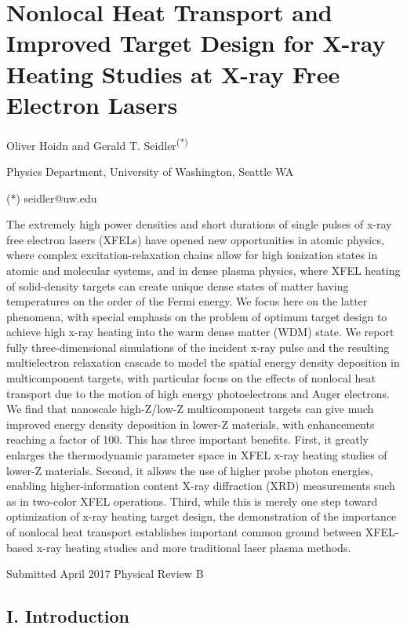 
\chapter{Nonlocal Heat Transport and Improved Target Design for X-ray Heating Studies at X-ray Free Electron Lasers}
\label{chap:hef_chapter}

Oliver Hoidn and Gerald T. Seidler\textsuperscript{(*)}

Physics Department, University of Washington, Seattle WA

(*) seidler@uw.edu

The extremely high power densities and short durations of single pulses
of x-ray free electron lasers (XFELs) have opened new opportunities in
atomic physics, where complex excitation-relaxation chains allow for
high ionization states in atomic and molecular systems, and in dense
plasma physics, where XFEL heating of solid-density targets can create
unique dense states of matter having temperatures on the order of the
Fermi energy. We focus here on the latter phenomena, with special
emphasis on the problem of optimum target design to achieve high x-ray
heating into the warm dense matter (WDM) state. We report fully
three-dimensional simulations of the incident x-ray pulse and the
resulting multielectron relaxation cascade to model the spatial energy
density deposition in multicomponent targets, with particular focus on
the effects of nonlocal heat transport due to the motion of high energy
photoelectrons and Auger electrons. We find that nanoscale high-Z/low-Z
multicomponent targets can give much improved energy density deposition
in lower-Z materials, with enhancements reaching a factor of 100. This
has three important benefits. First, it greatly enlarges the
thermodynamic parameter space in XFEL x-ray heating studies of lower-Z
materials. Second, it allows the use of higher probe photon energies,
enabling higher-information content X-ray diffraction (XRD) measurements
such as in two-color XFEL operations. Third, while this is merely one
step toward optimization of x-ray heating target design, the
demonstration of the importance of nonlocal heat transport establishes
important common ground between XFEL-based x-ray heating studies and
more traditional laser plasma methods.

Submitted April 2017 Physical Review B

\section{I. Introduction}

